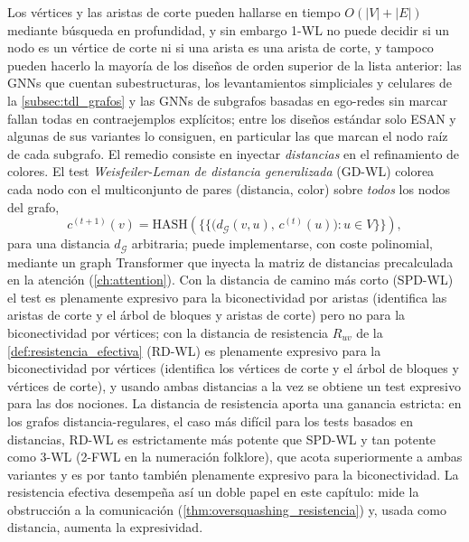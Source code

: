 Los vértices y las aristas de corte pueden hallarse en tiempo $O(|V| + |E|)$ mediante búsqueda en profundidad, y sin embargo 1-WL no puede decidir si un nodo es un vértice de corte ni si una arista es una arista de corte, y tampoco pueden hacerlo la mayoría de los diseños de orden superior de la lista anterior: las \glspl{GNN} que cuentan subestructuras, los levantamientos simpliciales y celulares de la \autoref{subsec:tdl_grafos} y las \glspl{GNN} de subgrafos basadas en ego-redes sin marcar fallan todas en contraejemplos explícitos; entre los diseños estándar solo ESAN y algunas de sus variantes lo consiguen, en particular las que marcan el nodo raíz de cada subgrafo. El remedio consiste en inyectar \textit{distancias} en el refinamiento de colores. El test \textit{Weisfeiler-Leman de distancia generalizada} (GD-WL) colorea cada nodo con el multiconjunto de pares (distancia, color) sobre \textit{todos} los nodos del grafo,
\begin{equation}\label{eq:gd_wl}
	c^{(t+1)}(v) = \mathrm{HASH}\!\left(\bigl\{\!\!\bigl\{ \bigl(d_{\mathcal{G}}(v,u),\, c^{(t)}(u)\bigr) : u \in V \bigr\}\!\!\bigr\}\right),
\end{equation}
para una distancia $d_{\mathcal{G}}$ arbitraria; puede implementarse, con coste polinomial, mediante un graph \gls{Transformer} que inyecta la matriz de distancias precalculada en la atención (\autoref{ch:attention}). Con la distancia de camino más corto (SPD-WL) el test es plenamente expresivo para la biconectividad por aristas (identifica las aristas de corte y el árbol de bloques y aristas de corte) pero no para la biconectividad por vértices; con la distancia de resistencia $R_{uv}$ de la \autoref{def:resistencia_efectiva} (RD-WL) es plenamente expresivo para la biconectividad por vértices (identifica los vértices de corte y el árbol de bloques y vértices de corte), y usando ambas distancias a la vez se obtiene un test expresivo para las dos nociones. La distancia de resistencia aporta una ganancia estricta: en los grafos distancia-regulares, el caso más difícil para los tests basados en distancias, RD-WL es estrictamente más potente que SPD-WL y tan potente como 3-WL (2-FWL en la numeración folklore), que acota superiormente a ambas variantes y es por tanto también plenamente expresivo para la biconectividad. La resistencia efectiva desempeña así un doble papel en este capítulo: mide la obstrucción a la comunicación (\autoref{thm:oversquashing_resistencia}) y, usada como distancia, aumenta la expresividad.

